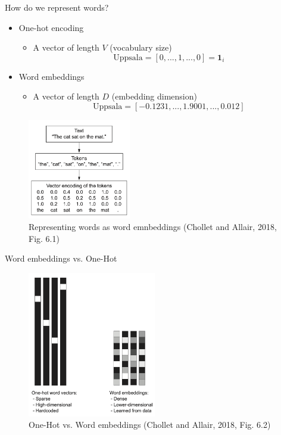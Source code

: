 \documentclass[10pt]{beamer}
\begin{document}
\begin{frame}{How do we represent words?}
\begin{itemize}
\item {\color{uured} One-hot} encoding
\begin{itemize}
\item A vector of length $V$ (vocabulary size)
\[
\text{Uppsala} = [0,...,1,...,0] = \mathbf{1}_i
\]
\end{itemize}
\pause
\item {\color{uured} Word embeddings}
\begin{itemize}
\item A vector of length $D$ (embedding dimension)
\[
\text{Uppsala} = [-0.1231,...,1.9001,...,0.012]
\]
\end{itemize}
\end{itemize}

\begin{figure}[h]
\centering
\includegraphics[width=0.4\textwidth]{fig/DLR_6_1_WE.png}
\caption{Representing words as word emnbeddings (Chollet and Allair, 2018, Fig. 6.1)}
\end{figure}

\end{frame}


\begin{frame}{Word embeddings vs. One-Hot}

\begin{figure}[h]
\centering
\includegraphics[width=0.5\textwidth]{fig/DLR_6_2_WE_VS_OH.png}
\caption{One-Hot vs. Word embeddings (Chollet and Allair, 2018, Fig. 6.2)}
\end{figure}

\end{frame}
\end{document}
